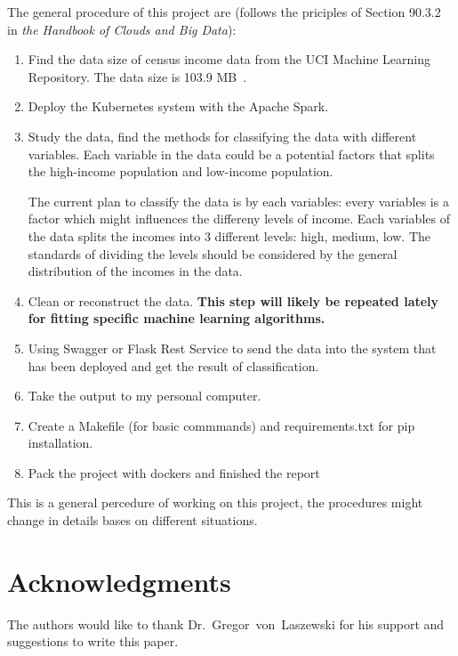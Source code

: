 The general procedure of this project are (follows the priciples of Section 90.3.2 in \textit{the Handbook of Clouds and Big Data}):
\begin{enumerate}
\item Find the data size of census income data from the UCI Machine Learning Repository. The data size is 103.9 MB~\cite{data}.
\item Deploy the Kubernetes system with the Apache Spark.
\item Study the data, find the methods for classifying the data with different variables. Each variable in the data could be a potential factors that splits the high-income population and low-income population.

The current plan to classify the data is by each variables: every variables is a factor which might influences the differeny levels of income. Each variables of the data splits the incomes into 3 different levels: high, medium, low. The standards of dividing the levels should be considered by the general distribution of the incomes in the data.
\item Clean or reconstruct the data. \textbf{This step will likely be repeated lately for fitting specific machine learning algorithms.}
\item Using Swagger or Flask Rest Service to send the data into the system that has been deployed and get the result of classification.
\item Take the output to my personal computer.
\item Create a Makefile (for basic commmands) and requirements.txt for pip installation.
\item Pack the project with dockers and finished the report
\end{enumerate}

This is a general percedure of working on this project, the procedures might change in details bases on different situations. 

\section{Acknowledgments}
\begin{acks}

  The authors would like to thank Dr.~Gregor~von~Laszewski for his
  support and suggestions to write this paper.

\end{acks}


 

